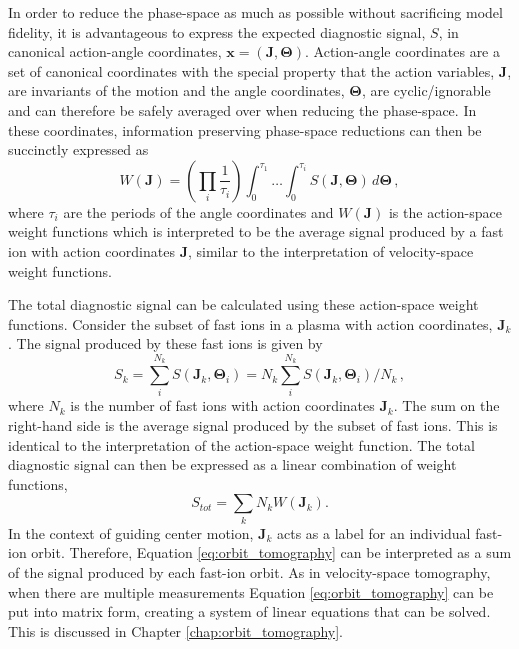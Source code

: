 In order to reduce the phase-space as much as possible without sacrificing model fidelity, it is advantageous to express the expected diagnostic signal, $S$, in canonical action-angle coordinates, $\mathbf{x} = (\mathbf{J},\mathbf{\Theta})$.
Action-angle coordinates are a set of canonical coordinates with the special property that the action variables, $\mathbf{J}$, are invariants of the motion and the angle coordinates, $\mathbf{\Theta}$, are cyclic/ignorable and can therefore be safely averaged over when reducing the phase-space. 
In these coordinates, information preserving phase-space reductions can then be succinctly expressed as
\begin{equation}\label{eq:action_angle_reduction}
    W(\mathbf{J}) = \left( \prod_i \frac{1}{\tau_i} \right) \int_0^{\tau_1}\ldots\int_0^{\tau_i} S(\mathbf{J},\mathbf{\Theta})\, d\mathbf{\Theta}\,,
\end{equation}
where $\tau_i$ are the periods of the angle coordinates and $W(\mathbf{J})$ is the action-space weight functions which is interpreted to be the average signal produced by a fast ion with action coordinates $\mathbf{J}$, similar to the interpretation of velocity-space weight functions. 

The total diagnostic signal can be calculated using these action-space weight functions. Consider the subset of fast ions in a plasma with action coordinates, $\mathbf{J}_k$.
The signal produced by these fast ions is given by
\begin{equation}\label{eq:orbit_tomography_discrete}
    S_k = \sum_i^{N_k} S(\mathbf{J}_k,\mathbf{\Theta}_i) = N_k \sum_i^{N_k} S(\mathbf{J}_k,\mathbf{\Theta}_i)/N_k\,,
\end{equation}
where $N_k$ is the number of fast ions with action coordinates $\mathbf{J}_k$.
The sum on the right-hand side is the average signal produced by the subset of fast ions. This is identical to the interpretation of the action-space weight function.
The total diagnostic signal can then be expressed as a linear combination of weight functions,
\begin{equation}\label{eq:orbit_tomography}
    S_{tot} = \sum_k N_k W(\mathbf{J}_k) .
\end{equation}
In the context of guiding center motion, $\mathbf{J}_k$ acts as a label for an individual fast-ion orbit. Therefore, Equation \ref{eq:orbit_tomography} can be interpreted as a sum of the signal produced by each fast-ion orbit.
As in velocity-space tomography, when there are multiple measurements Equation \ref{eq:orbit_tomography} can be put into matrix form, creating a system of linear equations that can be solved. This is discussed in Chapter \ref{chap:orbit_tomography}.

